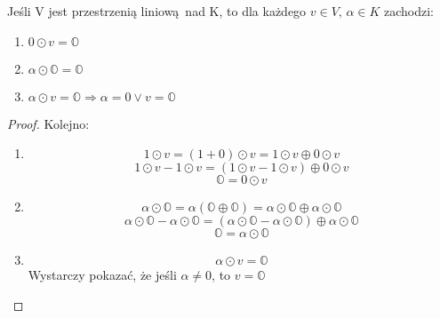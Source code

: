 \begin{theorem}
    Jeśli V jest przestrzenią liniową nad K, to dla każdego $v \in V, \, \alpha \in K$ zachodzi:
    \begin{enumerate}
        \item $ 0\odot v = \mathds{O}$
        \item $\alpha \odot \mathds{O} = \mathds{O}$
        \item $\alpha \odot v = \mathds{O} \Longrightarrow \alpha = 0 \vee v = \mathds{O}$
    \end{enumerate}
    \begin{proof} Kolejno:
        \begin{enumerate}
            \item
                \begin{equation*}
                    1\odot v = (1 + 0) \odot v = 1\odot v \oplus 0 \odot v
                \end{equation*}
                \begin{equation*}
                    1\odot v - 1\odot v = (1\odot v - 1\odot v) \oplus 0 \odot v
                \end{equation*}
                \begin{equation*}
                    \mathds{O} = 0 \odot v
                \end{equation*}
            \item
                \begin{equation*}
                    \alpha\odot\mathds{O} = \alpha(\mathds{O}\oplus\mathds{O}) = \alpha\odot\mathds{O}\oplus\alpha\odot\mathds{O}
                \end{equation*}
                \begin{equation*}
                    \alpha\odot\mathds{O}-\alpha\odot\mathds{O} = (\alpha\odot\mathds{O}-\alpha\odot\mathds{O})\oplus\alpha\odot\mathds{O}
                \end{equation*}
                \begin{equation*}
                    \mathds{O} = \alpha\odot\mathds{O}
                \end{equation*}
            \item
                \begin{equation*}
                    \alpha\odot v = \mathds{O}
                \end{equation*}
                Wystarczy pokazać, że jeśli  $\alpha\neq 0$, to $v = \mathds{O}$
                \begin{equation*}

\end{equation*}
\end{enumerate}
\end{proof}
\end{theorem}
